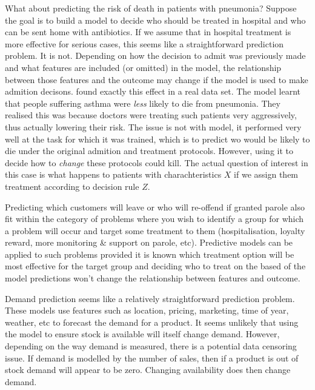 \documentclass[11pt,a4paper,oneside]{book}
\theoremstyle{plain}
\theoremstyle{definition}
\begin{document}
What about predicting the risk of death in patients with pneumonia? Suppose the goal is to build a model to decide who should be treated in hospital and who can be sent home with antibiotics. If we assume that in hospital treatment is more effective for serious cases, this seems like a straightforward prediction problem. It is not. Depending on how the decision to admit was previously made and what features are included (or omitted) in the model, the relationship between those features and the outcome may change if the model is used to make admition decisons. \citet{Caruana2015} found exactly this effect in a real data set. The model learnt that people suffering asthma were \emph{less} likely to die from pneumonia. They realised this was because doctors were treating such patients very aggressively, thus actually lowering their risk. The issue is not with model, it performed very well at the task for which it was trained, which is to predict wo would be likely to die under the original admition and treatment protocols. However, using it to decide how to \emph{change} these protocols could kill. The actual question of interest in this case is what happens to patients with charachteristics $X$ if we assign them treatment according to decision rule $Z$. 

Predicting which customers will leave or who will re-offend if granted parole also fit within the category of problems where you wish to identify a group for which a problem will occur and target some treatment to them (hospitalisation, loyalty reward, more monitoring \& support on parole, etc). Predictive models can be applied to such problems provided it is known which treatment option will be most effective for the target group and deciding who to treat on the based of the model predictions won't change the relationship between features and outcome.

Demand prediction seems like a relatively straightforward prediction problem. These models use features such as location, pricing, marketing, time of year, weather, etc to forecast the demand for a product. It seems unlikely that using the model to ensure stock is available will itself change demand. However, depending on the way demand is measured, there is a potential data censoring issue. If demand is modelled by the number of sales, then if a product is out of stock demand will appear to be zero. Changing availability does then change demand.
   
\end{document}
